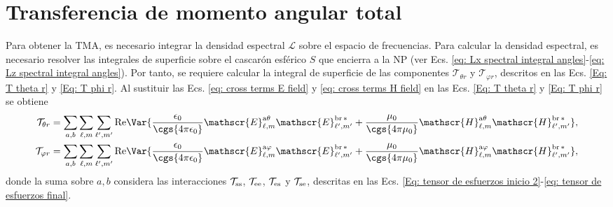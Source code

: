 \section{Transferencia de momento angular total}
Para obtener la TMA, es necesario integrar la densidad espectral $\mathcal{L}$ sobre el espacio de frecuencias. Para calcular la densidad espectral, es necesario resolver las integrales de superficie sobre el cascarón esférico $S$ que encierra a la NP (ver Ecs. \eqref{eq: Lx spectral integral angles}-\eqref{eq: Lz spectral integral angles}). Por tanto, se requiere calcular la integral de superficie de las componentes $\mathcal{T}_{\theta r}$ y $\mathcal{T}_{\varphi r}$, descritos en las Ecs. \eqref{Eq: T theta r} y \eqref{Eq: T phi r}. Al sustituir las Ecs. \eqref{eq: cross terms E field} y \eqref{eq: cross terms H field} en las Ecs. \eqref{Eq: T theta r} y \eqref{Eq: T phi r} se obtiene
\begin{align}
\mathcal{T}_{\theta r} &= \sum_{a,b}\sum_{\ell, m} \sum_{\ell^{\prime}, m^{\prime}} {\rm Re}\Var{\frac{\epsilon_0}{\cgs{4\pi\epsilon_0}} \mathscr{E}_{\ell, m}^{\text{a}\theta}\mathscr{E}_{\ell^{\prime}, m^{\prime}}^{\text{br}\,*} + \frac{\mu_0}{\cgs{4\pi\mu_0}} \mathscr{H}_{\ell, m}^{\text{a}\theta}\mathscr{H}_{\ell^{\prime}, m^{\prime}}^{\text{br}\,*}  }, \label{Eq: T theta t sum}\\
\mathcal{T}_{\varphi r} &= \sum_{a,b}\sum_{\ell, m} \sum_{\ell^{\prime}, m^{\prime}} {\rm Re}\Var{\frac{\epsilon_0}{\cgs{4\pi\epsilon_0}} \mathscr{E}_{\ell, m}^{\text{a}\varphi}\mathscr{E}_{\ell^{\prime}, m^{\prime}}^{\text{br}\,*} + \frac{\mu_0}{\cgs{4\pi\mu_0}} \mathscr{H}_{\ell, m}^{\text{a}\varphi}\mathscr{H}_{\ell^{\prime}, m^{\prime}}^{\text{br}\,*}  }, \label{Eq: T phi t sum}
\end{align}
donde la suma sobre $a, b$ considera las interacciones $\mathcal{T}_{\rm ss}$, $\mathcal{T}_{\rm ee}$, $\mathcal{T}_{\rm es}$ y $\mathcal{T}_{\rm se}$, descritas en las Ecs. \eqref{Eq: tensor de esfuerzos inicio 2}-\eqref{eq: tensor de esfuerzos final}.


